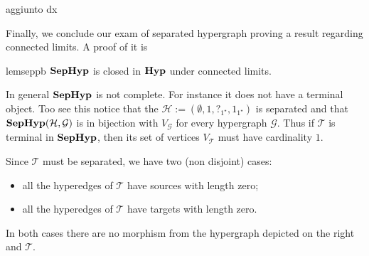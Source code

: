 \documentclass[3p]{elsarticle}
\newcommand{\catname}[1]{\textbf{\textup{#1}}}
\newcommand{\hyp}{\catname{Hyp}}
\newcommand{\shyp}{\catname{SepHyp}}
\theoremstyle{remark}
\theoremstyle{definition}
\begin{document}
\begin{prop}
	aggiunto dx
\end{prop}


Finally, we conclude our exam of separated hypergraph proving a result regarding connected limits. A proof of it is 

\begin{restatable}{lem}{seppb}\label{lem:seplim}
	$\shyp$ is closed in $\hyp$ under connected limits.
\end{restatable}



\begin{exa}\label{ex:noterm}
In general $\shyp$ is not complete. For instance it does not have a terminal object. Too see this notice that the $\mathcal{H}:=(\emptyset, 1, ?_{1^\star}, 1_{1^\star} )$ is separated and that 
$\shyp(\mathcal{H}, \mathcal{G})$ is in bijection with $V_{\mathcal{G}}$ for every hypergraph $\mathcal{G}$. Thus if  $\mathcal{T}$ is terminal in $\shyp$, then its set of vertices $V_{\mathcal{T}}$ must have cardinality $1$. 

Since $\mathcal{T}$ must be separated, we have two (non disjoint) cases:

\begin{minipage}[l]{.65\linewidth}
	\begin{itemize}
		\item  all the hyperedges of $\mathcal{T}$ have sources with length zero; 
		\item all the hyperedges of $\mathcal{T}$ have targets with length zero.
	\end{itemize}
\end{minipage}
\begin{minipage}[r]{.15\linewidth}
\end{minipage}

\medskip
In both cases there are no morphism from the hypergraph depicted on the right and $\mathcal{T}$.
\end{exa}
\end{document}
